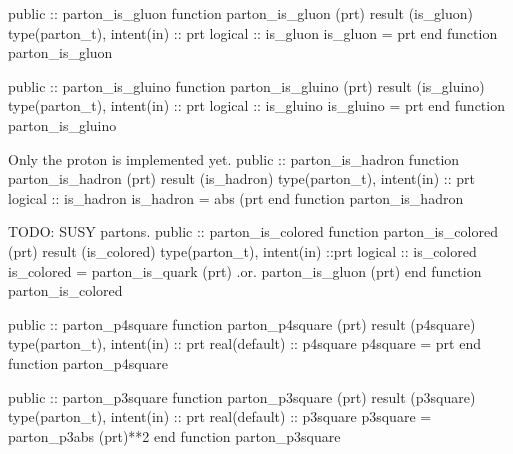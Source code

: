 \eatline
\nwendcode{}\nwdocspar
\nwenddocs{}\plusendmoddef
  public :: parton_is_gluon
\nwendcode{}\plusendmoddef
  function parton_is_gluon (prt) result (is_gluon)
    type(parton_t), intent(in) :: prt
    logical :: is_gluon
    is_gluon = prt%
  end function parton_is_gluon

\eatline
\nwendcode{}\plusendmoddef
  public :: parton_is_gluino
\nwendcode{}\plusendmoddef
  function parton_is_gluino (prt) result (is_gluino)
    type(parton_t), intent(in) :: prt
    logical :: is_gluino
    is_gluino = prt%
  end function parton_is_gluino

\eatline
\nwendcode{}Only the proton is implemented yet.
\nwenddocs{}\plusendmoddef
  public :: parton_is_hadron
\nwendcode{}\plusendmoddef
  function parton_is_hadron (prt) result (is_hadron)
    type(parton_t), intent(in) :: prt
    logical :: is_hadron
    is_hadron = abs (prt%
  end function parton_is_hadron

\eatline
\nwendcode{}TODO: SUSY partons.
\nwenddocs{}\plusendmoddef
  public :: parton_is_colored
\nwendcode{}\plusendmoddef
  function parton_is_colored (prt) result (is_colored)
    type(parton_t), intent(in) ::prt
    logical :: is_colored
    is_colored = parton_is_quark (prt) .or. parton_is_gluon (prt)
  end function parton_is_colored

\eatline
\nwendcode{}\nwdocspar
\nwenddocs{}\plusendmoddef
  public :: parton_p4square
\nwendcode{}\plusendmoddef
  function parton_p4square (prt) result (p4square)
    type(parton_t), intent(in) :: prt
    real(default) :: p4square
    p4square = prt%
  end function parton_p4square

\eatline
\nwendcode{}\nwdocspar
\nwenddocs{}\plusendmoddef
  public :: parton_p3square
\nwendcode{}\plusendmoddef
  function parton_p3square (prt) result (p3square)
    type(parton_t), intent(in) :: prt
    real(default) :: p3square
    p3square = parton_p3abs (prt)**2
  end function parton_p3square

